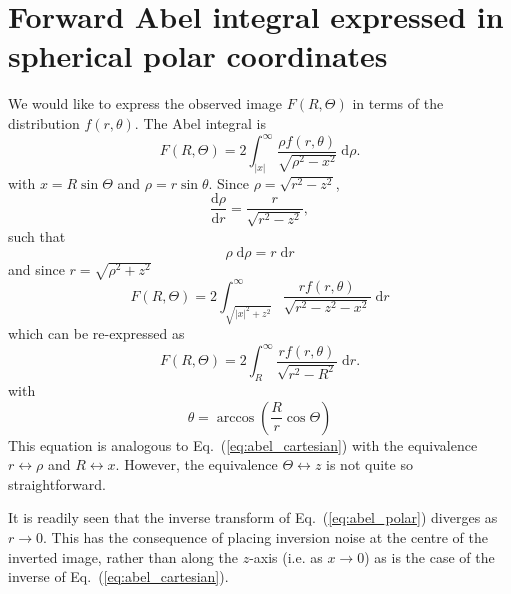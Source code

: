 \documentclass{article}
\renewcommand{\eqref}[1]{Eq.~(\ref{#1})}
\begin{document}
\section{Forward Abel integral expressed in spherical polar coordinates} 
We would like to express the observed image $F(R, \Theta)$ in terms of the
distribution $f(r, \theta)$. The Abel integral is
\begin{equation}
  F(R, \Theta)=2\int_{|x|}^\infty
  \frac{\rho f(r, \theta)}{\sqrt{\rho^2-x^2}}\;\mathrm{d}\rho.
\end{equation}
with $x=R\sin\Theta$ and $\rho=r\sin\theta$. Since $\rho=\sqrt{r^2-z^2}$,
\begin{equation}
  \frac{\mathrm{d}\rho}{\mathrm{d}r}=
  \frac{r}{\sqrt{r^2-z^2}},
\end{equation}
such that
\begin{equation}
  \rho\;\mathrm{d}\rho=r\;\mathrm{d}r
\end{equation}
and since $r=\sqrt{\rho^2+z^2}$
\begin{equation}
  F(R, \Theta)=
  2\int_{\sqrt{|x|^2+z^2}}^\infty
  \frac{rf(r, \theta)}{\sqrt{r^2-z^2-x^2}}\;\mathrm{d}r
\end{equation}
which can be re-expressed as
\begin{equation}
  \label{eq:abel_polar}
  F(R, \Theta)=
  2\int_{R}^\infty
  \frac{rf(r, \theta)}{\sqrt{r^2-R^2}}\;\mathrm{d}r.
\end{equation}
with 
\begin{equation}
  \theta=\arccos\left(
    \frac{R}{r}\cos\Theta
  \right)
\end{equation}
This equation is analogous to \eqref{eq:abel_cartesian} with the equivalence
$r\leftrightarrow\rho$ and $R\leftrightarrow x$. However, the equivalence
$\Theta\leftrightarrow z$ is not quite so straightforward.

It is readily seen that the inverse transform of \eqref{eq:abel_polar}
diverges as $r\rightarrow0$. This has the consequence of placing inversion
noise at the centre of the inverted image, rather than along the $z$-axis
(i.e. as $x\rightarrow0$) as is the case of the inverse of
\eqref{eq:abel_cartesian}.
\end{document}
